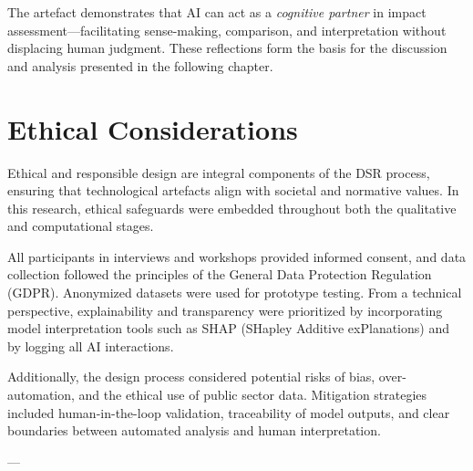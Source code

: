 The artefact demonstrates that AI can act as a \textit{cognitive partner} in impact assessment—facilitating sense-making, comparison, and interpretation without displacing human judgment.
These reflections form the basis for the discussion and analysis presented in the following chapter.


\section{Ethical Considerations}\label{sec:ethical-considerations}

Ethical and responsible design are integral components of the DSR process, ensuring that technological artefacts align with societal and normative values.
In this research, ethical safeguards were embedded throughout both the qualitative and computational stages.

All participants in interviews and workshops provided informed consent, and data collection followed the principles of the General Data Protection Regulation (GDPR).
Anonymized datasets were used for prototype testing.
From a technical perspective, explainability and transparency were prioritized by incorporating model interpretation tools such as SHAP (SHapley Additive exPlanations) and by logging all AI interactions.

Additionally, the design process considered potential risks of bias, over-automation, and the ethical use of public sector data.
Mitigation strategies included human-in-the-loop validation, traceability of model outputs, and clear boundaries between automated analysis and human interpretation.

---